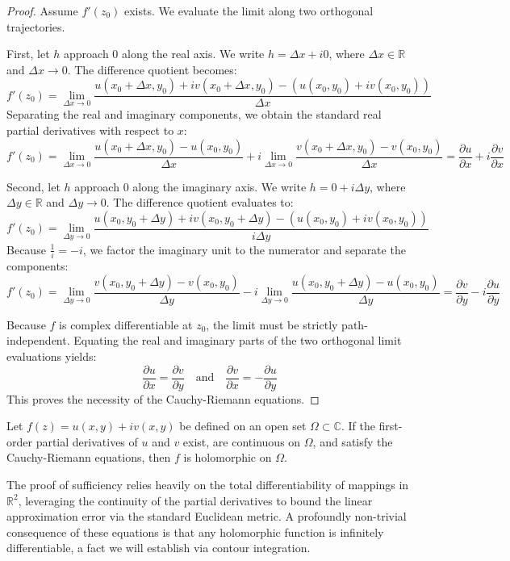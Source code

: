 \begin{proof}
Assume $f'(z_0)$ exists. We evaluate the limit along two orthogonal trajectories. 
    
First, let $h$ approach $0$ along the real axis. We write $h = \Delta x + i0$, where $\Delta x \in \mathbb{R}$ and $\Delta x \to 0$. The difference quotient becomes:
\[
f'(z_0) = \lim_{\Delta x \to 0} \frac{u(x_0 + \Delta x, y_0) + i v(x_0 + \Delta x, y_0) - (u(x_0, y_0) + i v(x_0, y_0))}{\Delta x}
\]
Separating the real and imaginary components, we obtain the standard real partial derivatives with respect to $x$:
\[
f'(z_0) = \lim_{\Delta x \to 0} \frac{u(x_0 + \Delta x, y_0) - u(x_0, y_0)}{\Delta x} + i \lim_{\Delta x \to 0} \frac{v(x_0 + \Delta x, y_0) - v(x_0, y_0)}{\Delta x} = \frac{\partial u}{\partial x} + i \frac{\partial v}{\partial x}
\]
    
Second, let $h$ approach $0$ along the imaginary axis. We write $h = 0 + i\Delta y$, where $\Delta y \in \mathbb{R}$ and $\Delta y \to 0$. The difference quotient evaluates to:
\[
f'(z_0) = \lim_{\Delta y \to 0} \frac{u(x_0, y_0 + \Delta y) + i v(x_0, y_0 + \Delta y) - (u(x_0, y_0) + i v(x_0, y_0))}{i \Delta y}
\]
Because $\frac{1}{i} = -i$, we factor the imaginary unit to the numerator and separate the components:
\[
f'(z_0) = \lim_{\Delta y \to 0} \frac{v(x_0, y_0 + \Delta y) - v(x_0, y_0)}{\Delta y} - i \lim_{\Delta y \to 0} \frac{u(x_0, y_0 + \Delta y) - u(x_0, y_0)}{\Delta y} = \frac{\partial v}{\partial y} - i \frac{\partial u}{\partial y}
\]
    
Because $f$ is complex differentiable at $z_0$, the limit must be strictly path-independent. Equating the real and imaginary parts of the two orthogonal limit evaluations yields:
\[
\frac{\partial u}{\partial x} = \frac{\partial v}{\partial y} \quad \text{and} \quad \frac{\partial v}{\partial x} = -\frac{\partial u}{\partial y}
\]
This proves the necessity of the Cauchy-Riemann equations.
\end{proof}

\begin{theorem}
Let $f(z) = u(x, y) + i v(x, y)$ be defined on an open set $\Omega \subset \mathbb{C}$. If the first-order partial derivatives of $u$ and $v$ exist, are continuous on $\Omega$, and satisfy the Cauchy-Riemann equations, then $f$ is holomorphic on $\Omega$.
\end{theorem}

The proof of sufficiency relies heavily on the total differentiability of mappings in $\mathbb{R}^2$, leveraging the continuity of the partial derivatives to bound the linear approximation error via the standard Euclidean metric. A profoundly non-trivial consequence of these equations is that any holomorphic function is infinitely differentiable, a fact we will establish via contour integration.
